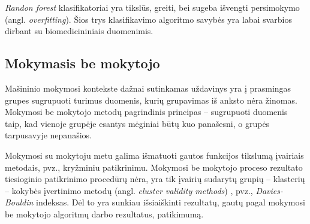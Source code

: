 \textit{Randon forest} klasifikatoriai yra tikslūs, greiti, bei sugeba išvengti persimokymo (angl. \textit{overfitting}). Šios trys klasifikavimo algoritmo savybės yra labai svarbios dirbant su biomedicininiais duomenimis. 

\subsection{Mokymasis be mokytojo}

Mašininio mokymosi kontekste dažnai sutinkamas uždavinys yra į prasmingas grupes sugrupuoti turimus duomenis, kurių grupavimas iš anksto nėra žinomas. Mokymosi be mokytojo metodų pagrindinis principas -- sugrupuoti duomenis taip, kad vienoje grupėje esantys mėginiai būtų kuo panašesni, o grupės tarpusavyje nepanašios.

Mokymosi su mokytoju metu galima išmatuoti gautos funkcijos tikslumą įvairiais metodais, pvz., kryžminiu patikrinimu. Mokymosi be mokytojo proceso rezultato tiesioginio patikrinimo procedūrų nėra, yra tik įvairių sudarytų grupių -- klasterių -- kokybės įvertinimo metodų (angl. \textit{cluster validity methods}) \cite{journals/sigmod/HalkidiBV02}, pvz., \textit{Davies-Bouldin} indeksas. Dėl to yra sunkiau išsiaiškinti rezultatų, gautų pagal mokymosi be mokytojo algoritmų darbo rezultatus, patikimumą. 


